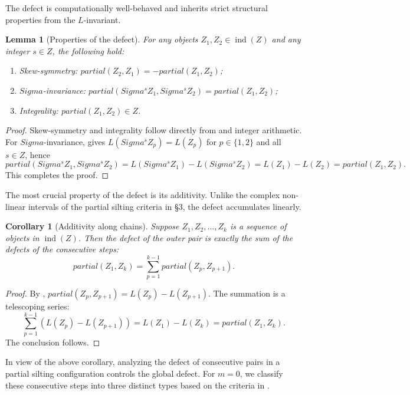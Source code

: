 \documentclass[11pt, a4paper]{article}
\newtheorem{lemma}[theorem]{Lemma}
\newtheorem{corollary}[theorem]{Corollary}
\theoremstyle{definition}
\def\Sigma{Sigma}%
\def\partial{partial}%
\def\mathbb#1{#1}%
\def\mathcal#1{#1}%
\begin{document}
The defect is computationally well-behaved and inherits strict structural properties from the $L$-invariant.

\begin{lemma}[Properties of the defect]\label{lem:defect-props}
For any objects $Z_1, Z_2 \in \operatorname{ind}(\mathcal Z)$ and any integer $s \in \mathbb Z$, the following hold:
\begin{enumerate}[label=\textup{(\roman*)}]
    \item \emph{Skew-symmetry:} $\partial(Z_2, Z_1) = -\partial(Z_1, Z_2)$;
    \item \emph{$\Sigma$-invariance:} $\partial(\Sigma^s Z_1, \Sigma^s Z_2) = \partial(Z_1, Z_2)$;
    \item \emph{Integrality:} $\partial(Z_1, Z_2) \in \mathbb Z$.
\end{enumerate}
\end{lemma}

\begin{proof}
Skew-symmetry and integrality follow directly from  and integer arithmetic. For $\Sigma$-invariance,  gives $L(\Sigma^s Z_p) = L(Z_p)$ for $p \in \{1, 2\}$ and all $s\in\mathbb Z$, hence
\[
  \partial(\Sigma^s Z_1, \Sigma^s Z_2) = L(\Sigma^s Z_1) - L(\Sigma^s Z_2) = L(Z_1) - L(Z_2) = \partial(Z_1, Z_2).
\]
This completes the proof.
\end{proof}

The most crucial property of the defect is its additivity. Unlike the complex non-linear intervals of the partial silting criteria in \S 3, the defect accumulates linearly.

\begin{corollary}[Additivity along chains]\label{cor:defect-chain}
Suppose $Z_1, Z_2, \ldots, Z_k$ is a sequence of objects in $\operatorname{ind}(\mathcal Z)$. Then the defect of the outer pair is exactly the sum of the defects of the consecutive steps:
\[
  \partial(Z_1, Z_k) = \sum_{p=1}^{k-1} \partial(Z_p, Z_{p+1}).
\]
\end{corollary}

\begin{proof}
By , $\partial(Z_p, Z_{p+1}) = L(Z_p) - L(Z_{p+1})$. The summation is a telescoping series:
\[
  \sum_{p=1}^{k-1} (L(Z_p) - L(Z_{p+1})) = L(Z_1) - L(Z_k) = \partial(Z_1, Z_k).
\]
The conclusion follows.
\end{proof}

In view of the above corollary, analyzing the defect of consecutive pairs in a partial silting configuration controls the global defect. For $m=0$, we classify these consecutive steps into three distinct types based on the criteria in .
\end{document}
